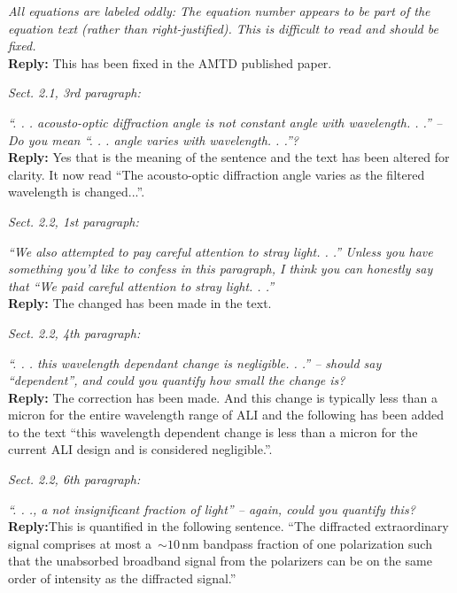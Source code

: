 \documentclass[12pt, notitlepage]{article}
\begin{document}
\textit{All equations are labeled oddly: The equation number appears to be part of the equation
text (rather than right-justified). This is difficult to read and should be fixed.}\\

\textbf{Reply:} This has been fixed in the AMTD published paper.

\hrulefill

\textit{Sect. 2.1, 3rd paragraph:}

\textit{``. . . acousto-optic diffraction angle is not constant angle with wavelength. . .'' – Do you
mean ``. . . angle varies with wavelength. . .''?}\\

\textbf{Reply:} Yes that is the meaning of the sentence and the text has been altered for clarity. It now read ``The acousto-optic diffraction angle varies as the filtered wavelength is changed...''.

\hrulefill

\textit{Sect. 2.2, 1st paragraph:}

\textit{``We also attempted to pay careful attention to stray light. . .'' Unless you have something
you'd like to confess in this paragraph, I think you can honestly say that ``We paid careful
attention to stray light. . .''}\\

\textbf{Reply:} The changed has been made in the text.

\hrulefill

\textit{Sect. 2.2, 4th paragraph:}

\textit{``. . . this wavelength dependant change is negligible. . .'' – should say ``dependent'', and
could you quantify how small the change is?}\\

\textbf{Reply:} The correction has been made. And this change is typically less than a micron for the entire wavelength range of ALI and the following has been added to the text ``this wavelength dependent change is less than a micron for the current ALI design and is considered negligible.''.

\hrulefill

\textit{Sect. 2.2, 6th paragraph:}

\textit{``. . ., a not insignificant fraction of light'' – again, could you quantify this?}\\

\textbf{Reply:}This is quantified in the following sentence. ``The diffracted extraordinary signal comprises at
most a~$\sim 10$\,nm bandpass fraction of one polarization such
that the unabsorbed broadband signal from the polarizers can be on the
same order of intensity as the diffracted signal.''
\end{document}
